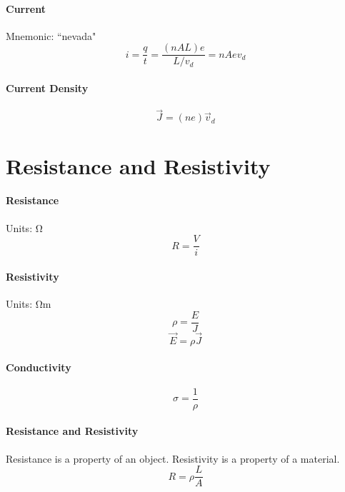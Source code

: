 \documentclass{article}
\begin{document}
        \paragraph{Current} Mnemonic: ``nevada"
        \begin{equation}
            i = \frac{q}{t} = \frac{\left( n A L \right) e}{L/v_d} = n A e v_d
        \end{equation}

        \paragraph{Current Density}
        \begin{equation}
            \vec{J} = \left( n e \right) \vec{v}_d
        \end{equation}

    \section{Resistance and Resistivity}

        \paragraph{Resistance}
        Units: $\si{\ohm}$
        \begin{equation}
            R = \frac{V}{i}
        \end{equation}

        \paragraph{Resistivity}
        Units: $\si{\ohm\meter}$
        \begin{equation}
            \rho = \frac{E}{J}
        \end{equation}
        \begin{equation}
            \vec{E} = \rho \vec{J}
        \end{equation}
        
        \paragraph{Conductivity}
        \begin{equation}
            \sigma = \frac{1}{\rho}
        \end{equation}

        \paragraph{Resistance and Resistivity}
        Resistance is a property of an object. Resistivity is a property of a material.
        \begin{equation}
            R = \rho \frac{L}{A}
        \end{equation}
\end{document}

